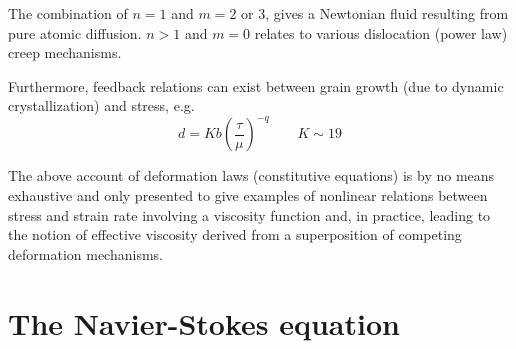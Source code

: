The combination of $n=1$ and $m=2$ or 3, gives a Newtonian fluid resulting from pure
atomic diffusion. $n>1$ and $m=0$ relates to various dislocation (power law) creep
mechanisms.

Furthermore, feedback relations can exist between grain growth (due to dynamic
crystallization) and stress, e.g.
\begin{equation}
d = K b \left( \frac{\tau}{\mu} \right)^{-q} \qquad K\sim 19
\end{equation}

The above account of deformation laws (constitutive equations) is by no means
exhaustive and only presented to give examples of nonlinear relations between stress and
strain rate involving a viscosity function and, in practice, leading to the notion of
effective viscosity derived from a superposition of competing deformation mechanisms.



\vspace{0.5cm}
\vspace{0.5cm}



\section{The Navier-Stokes equation}

